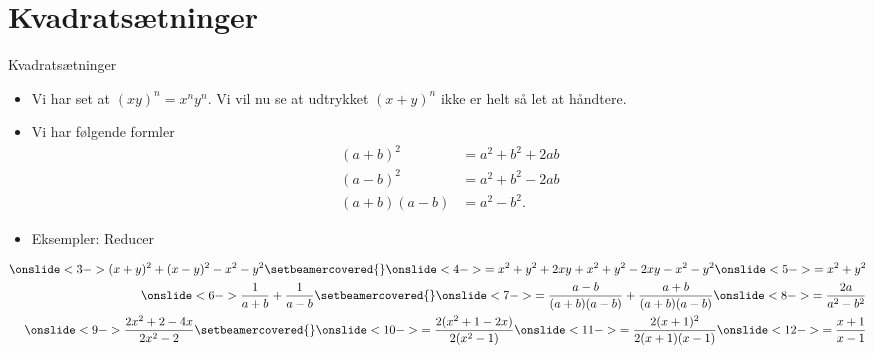 \section{Kvadratsætninger}
\begin{frame}{Kvadratsætninger}
	\vspace{-0.5cm}
\begin{itemize}
		\setlength\itemsep{1em}
	\item<1-> Vi har set at $(xy)^n=x^ny^n$. Vi vil nu se at udtrykket $(x+y)^n$ ikke er helt så let at håndtere. 
	\item<2-> Vi har følgende formler
	\begin{align*}
	(a+b)^2&=a^2+b^2+2ab\\
	(a-b)^2&=a^2+b^2-2ab\\
	(a+b)(a-b)&=a^2-b^2.
	\end{align*}
	\item<3-> Eksempler: Reducer
\end{itemize}
\begin{align*}
\onslide<3->{(x+y)^2+(x-y)^2-x^2-y^2\setbeamercovered{}\onslide<4->{=x^2+y^2+2xy+x^2+y^2-2xy-x^2-y^2}\onslide<5->{=x^2+y^2}}\\
\onslide<6->{ \frac{1}{a+b}+\frac{1}{a-b}\setbeamercovered{}\onslide<7->{=\frac{a-b}{(a+b)(a-b)}+\frac{a+b}{(a+b)(a-b)}\onslide<8->{=\frac{2a}{a^2-b^2}}}}\\
\onslide<9->{\frac{2x^2+2-4x}{2x^2-2}\setbeamercovered{}\onslide<10->{=\frac{2(x^2+1-2x)}{2(x^2-1)}\onslide<11->{=\frac{2(x+1)^2}{2(x+1)(x-1)}\onslide<12->{=\frac{x+1}{x-1}}}}}
\end{align*}
\end{frame}

